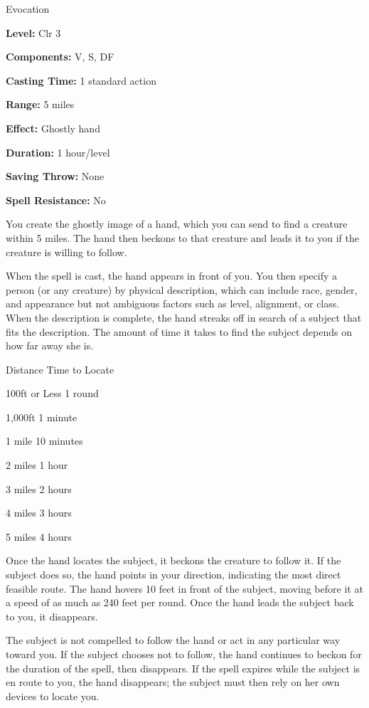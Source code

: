 
Evocation

\textbf{Level:} Clr 3

\textbf{Components:} V, S, DF

\textbf{Casting Time:} 1 standard action

\textbf{Range:} 5 miles

\textbf{Effect:} Ghostly hand

\textbf{Duration:} 1 hour/level

\textbf{Saving Throw:} None

\textbf{Spell Resistance:} No

You create the ghostly image of a hand, which you can send to find a creature within 
5 miles. The hand then beckons to that creature and leads it to you if the creature 
is willing to follow.

When the spell is cast, the hand appears in front of you. You then specify a person 
(or any creature) by physical description, which can include race, gender, and 
appearance but not ambiguous factors such as level, alignment, or class. When the 
description is complete, the hand streaks off in search of a subject that fits 
the description. The amount of time it takes to find the subject depends on how 
far away she is.

\begin{description*}
\item[Distance] Time to Locate
\item[100ft or Less] 1 round
\item[1,000ft] 1 minute
\item[1 mile] 10 minutes
\item[2 miles] 1 hour
\item[3 miles] 2 hours
\item[4 miles] 3 hours
\item[5 miles] 4 hours
\end{description*}

Once the hand locates the subject, it beckons the creature to follow it. If the 
subject does so, the hand points in your direction, indicating the most direct 
feasible route. The hand hovers 10 feet in front of the subject, moving before 
it at a speed of as much as 240 feet per round. Once the hand leads the subject 
back to you, it disappears.

The subject is not compelled to follow the hand or act in any particular way toward 
you. If the subject chooses not to follow, the hand continues to beckon for the 
duration of the spell, then disappears. If the spell expires while the subject 
is en route to you, the hand disappears; the subject must then rely on her own 
devices to locate you.

